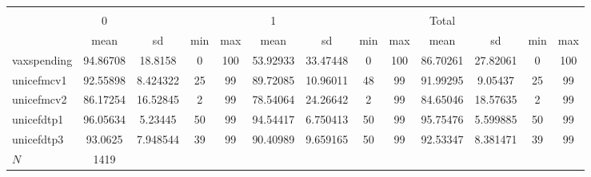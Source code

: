 \begin{tabular}{l*{3}{cccc}}
\hline\hline
                    &\multicolumn{12}{c}{}                                                                                                                                      \\
                    &           0&            &            &            &           1&            &            &            &       Total&            &            &            \\
                    &        mean&          sd&         min&         max&        mean&          sd&         min&         max&        mean&          sd&         min&         max\\
\hline
vaxspending         &    94.86708&     18.8158&           0&         100&    53.92933&    33.47448&           0&         100&    86.70261&    27.82061&           0&         100\\
unicefmcv1          &    92.55898&    8.424322&          25&          99&    89.72085&    10.96011&          48&          99&    91.99295&     9.05437&          25&          99\\
unicefmcv2          &    86.17254&    16.52845&           2&          99&    78.54064&    24.26642&           2&          99&    84.65046&    18.57635&           2&          99\\
unicefdtp1          &    96.05634&     5.23445&          50&          99&    94.54417&    6.750413&          50&          99&    95.75476&    5.599885&          50&          99\\
unicefdtp3          &     93.0625&    7.948544&          39&          99&    90.40989&    9.659165&          50&          99&    92.53347&    8.381471&          39&          99\\
\hline
\(N\)               &        1419&            &            &            &            &            &            &            &            &            &            &            \\
\hline\hline
\end{tabular}
